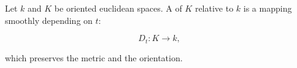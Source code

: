 Let $k$ and $K$ be oriented euclidean spaces. A  of $K$ relative to $k$ is a mapping smoothly depending on $t$:

$$D_t: K \rightarrow k,$$

which preserves the metric and the orientation.
